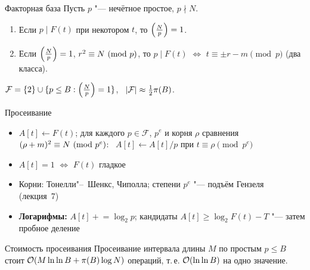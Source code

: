 \documentclass{ca-slides}
\begin{document}
\begin{theoremframe}[proposition]{Факторная база}
  Пусть $p$ "--- нечётное простое, $p \nmid N$.
  \begin{enumerate}
    \item Если $p \mid F(t)$ при некотором $t$, то $\left(\frac{N}{p}\right) = 1$.
    \item Если $\left(\frac{N}{p}\right) = 1$, $r^2 \equiv N\ (\mathrm{mod}\ p)$, то $p \mid F(t)$ $\iff$
      $t \equiv \pm r - m \pmod p$ (два класса).
  \end{enumerate}
  $\mathcal F = \{2\} \cup \{p \le B : \left(\frac{N}{p}\right) = 1\}$, \ $\lvert\mathcal F\rvert \approx \frac12\pi(B)$.
\end{theoremframe}

\begin{canvasframe}{Просеивание}
  \begin{itemize}
    \item $A[t] \gets F(t)$; для каждого $p \in \mathcal F$, $p^e$ и корня $\rho$ сравнения
      $(\rho + m)^2 \equiv N\ (\mathrm{mod}\ p^e)$: \ $A[t] \gets A[t]/p$ при $t \equiv \rho \pmod{p^e}$
    \item $A[t] = 1$ $\iff$ $F(t)$ гладкое
    \item Корни: Тонелли"--~Шенкс, Чиполла; степени $p^e$ "--- подъём Гензеля (лекция~7)
    \item \textbf{Логарифмы:} $A[t] \mathrel{+}= \log_2 p$; кандидаты
      $A[t] \ge \log_2 F(t) - T$ "--- затем пробное деление
  \end{itemize}
  \vfill
\end{canvasframe}

\begin{theoremframe}[lemma]{Стоимость просеивания}
  Просеивание интервала длины $M$ по простым $p \le B$ стоит
  $\mathcal{O}(M \ln\ln B + \pi(B)\log N)$ операций, т.\,е. $\mathcal{O}(\ln\ln B)$ на одно значение.
\end{theoremframe}
\end{document}
